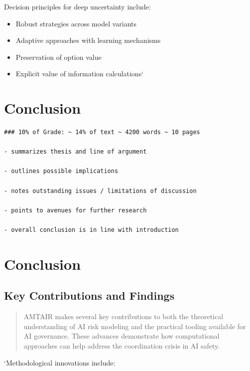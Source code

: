 \documentclass[12pt,a4paper]{report}
\providecommand{\tightlist}{%
  \setlength{\itemsep}{0pt}\setlength{\parskip}{0pt}}
\begin{document}
Decision principles for deep uncertainty include:

\begin{itemize}
\tightlist
\item
  Robust strategies across model variants
\item
  Adaptive approaches with learning mechanisms
\item
  Preservation of option value
\item
  Explicit value of information calculations`
\end{itemize}


\chapter{Conclusion}\label{conclusion}

\begin{verbatim}
### 10% of Grade: ~ 14% of text ~ 4200 words ~ 10 pages

- summarizes thesis and line of argument

- outlines possible implications

- notes outstanding issues / limitations of discussion

- points to avenues for further research

- overall conclusion is in line with introduction
\end{verbatim}


\chapter{Conclusion}\label{sec-conclusion}

\section{Key Contributions and Findings}\label{sec-key-contributions}

\begin{quote}
AMTAIR makes several key contributions to both the theoretical
understanding of AI risk modeling and the practical tooling available
for AI governance. These advances demonstrate how computational
approaches can help address the coordination crisis in AI safety.
\end{quote}

`Methodological innovations include:
\end{document}
